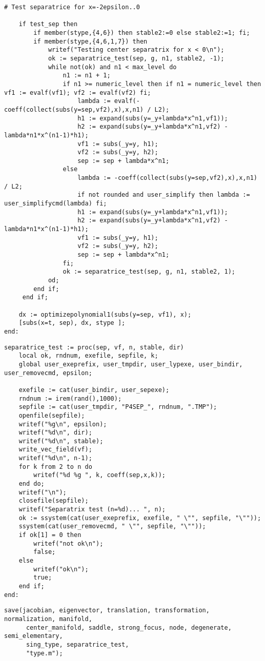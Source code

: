 \documentclass[a4paper,10pt]{article}
\begin{document}
\begin{lstlisting}[name=type]
    # Test separatrice for x=-2epsilon..0

    if test_sep then
        if member(stype,{4,6}) then stable2:=0 else stable2:=1; fi;
        if member(stype,{4,6,1,7}) then
            writef("Testing center separatrix for x < 0\n");
            ok := separatrice_test(sep, g, n1, stable2, -1);
            while not(ok) and n1 < max_level do
                n1 := n1 + 1;
                if n1 >= numeric_level then if n1 = numeric_level then vf1 := evalf(vf1); vf2 := evalf(vf2) fi;
                    lambda := evalf(-coeff(collect(subs(y=sep,vf2),x),x,n1) / L2);
                    h1 := expand(subs(y=_y+lambda*x^n1,vf1));
                    h2 := expand(subs(y=_y+lambda*x^n1,vf2) - lambda*n1*x^(n1-1)*h1);
                    vf1 := subs(_y=y, h1);
                    vf2 := subs(_y=y, h2);
                    sep := sep + lambda*x^n1;
                else
                    lambda := -coeff(collect(subs(y=sep,vf2),x),x,n1) / L2;
                    if not rounded and user_simplify then lambda := user_simplifycmd(lambda) fi;
                    h1 := expand(subs(y=_y+lambda*x^n1,vf1));
                    h2 := expand(subs(y=_y+lambda*x^n1,vf2) - lambda*n1*x^(n1-1)*h1);
                    vf1 := subs(_y=y, h1);
                    vf2 := subs(_y=y, h2);
                    sep := sep + lambda*x^n1;
                fi;
                ok := separatrice_test(sep, g, n1, stable2, 1);
            od;
        end if;
     end if;

    dx := optimizepolynomial1(subs(y=sep, vf1), x);
    [subs(x=t, sep), dx, stype ];
end:
\end{lstlisting}

\begin{lstlisting}[name=type]
separatrice_test := proc(sep, vf, n, stable, dir)
    local ok, rndnum, exefile, sepfile, k;
    global user_exeprefix, user_tmpdir, user_lypexe, user_bindir, user_removecmd, epsilon;

    exefile := cat(user_bindir, user_sepexe);
    rndnum := irem(rand(),1000);
    sepfile := cat(user_tmpdir, "P4SEP_", rndnum, ".TMP");
    openfile(sepfile);
    writef("%g\n", epsilon);
    writef("%d\n", dir);
    writef("%d\n", stable);
    write_vec_field(vf);
    writef("%d\n", n-1);
    for k from 2 to n do
        writef("%d %g ", k, coeff(sep,x,k));
    end do;
    writef("\n");
    closefile(sepfile);
    writef("Separatrix test (n=%d)... ", n);
    ok := ssystem(cat(user_exeprefix, exefile, " \"", sepfile, "\""));
    ssystem(cat(user_removecmd, " \"", sepfile, "\""));
    if ok[1] = 0 then
        writef("not ok\n");
        false;
    else
        writef("ok\n");
        true;
    end if;
end:
\end{lstlisting}

\begin{lstlisting}[name=type]
save(jacobian, eigenvector, translation, transformation, normalization, manifold,
      center_manifold, saddle, strong_focus, node, degenerate, semi_elementary,
      sing_type, separatrice_test,
      "type.m");
\end{lstlisting}
\end{document}
